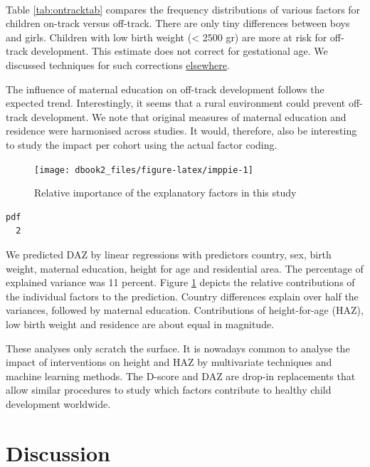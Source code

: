 \documentclass[
]{book}
\begin{document}
~

Table \ref{tab:ontracktab} compares the frequency distributions of various factors for children on-track versus off-track. There are only tiny differences between boys and girls. Children with low birth weight (\textless{} 2500 gr) are more at risk for off-track development. This estimate does not correct for gestational age. We discussed techniques for such corrections \href{https://d-score.org/dbook1/sec-pops.html}{elsewhere}.

The influence of maternal education on off-track development follows the expected trend. Interestingly, it seems that a rural environment could prevent off-track development. We note that original measures of maternal education and residence were harmonised across studies. It would, therefore, also be interesting to study the impact per cohort using the actual factor coding.

\begin{figure}

{\centering \texttt{[image: dbook2\_files/figure-latex/imppie-1]} 

}

\caption{Relative importance of the explanatory factors in this study}\label{fig:imppie}
\end{figure}

\begin{verbatim}
pdf 
  2 
\end{verbatim}



We predicted DAZ by linear regressions with predictors country, sex, birth weight, maternal education, height for age and residential area. The percentage of explained variance was 11 percent. Figure \ref{fig:imppie} depicts the relative contributions of the individual factors to the prediction. Country differences explain over half the variances, followed by maternal education. Contributions of height-for-age (HAZ), low birth weight and residence are about equal in magnitude.

These analyses only scratch the surface. It is nowadays common to analyse the impact of interventions on height and HAZ by multivariate techniques and machine learning methods. The D-score and DAZ are drop-in replacements that allow similar procedures to study which factors contribute to healthy child development worldwide.

\newpage

\hypertarget{ch:discussion2}{%
\chapter{Discussion}\label{ch:discussion2}}
\end{document}
